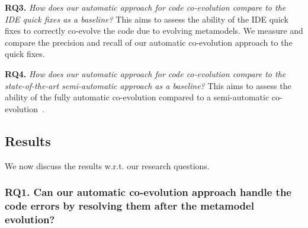 	
	\textbf{RQ3.} \emph{How does our automatic approach for code co-evolution compare to the IDE quick fixes as a baseline?} 
	This aims to assess the ability of the IDE quick fixes to correctly co-evolve the code due to evolving metamodels. We measure and compare the precision and recall of our automatic co-evolution approach to the quick fixes.   
	
	\textbf{RQ4.} \emph{How does our automatic approach for code co-evolution compare to the state-of-the-art semi-automatic approach as a baseline?} 
	This aims to assess the ability of the fully automatic co-evolution compared to a semi-automatic co-evolution~\cite{Khelladi2020}. 
	
	
	

	
	
	
	\subsection{Results}
	We now discuss the results w.r.t. our research questions.
	
	\subsubsection{RQ1. Can our automatic co-evolution approach handle the code errors by resolving them after the metamodel evolution?} 
	
